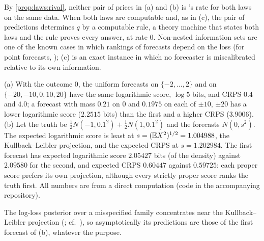 By \cref{prop:laws:rival}, neither pair of prices in (a) and (b) is \SAIabbr's rate for both laws on the same data. When both laws are computable and, as in (c), the pair of predictions determines $q$ by a computable rule, a theory machine that states both laws and the rule proves every answer, at rate $0$. Non-nested information sets are one of the known cases in which rankings of forecasts depend on the loss (for point forecasts, \citealp{patton2020comparing}); (c) is an exact instance in which no forecaster is miscalibrated relative to its own information.

\begin{example}\label{ex:laws:misspecified}
(a) With the outcome $0$, the uniform forecasts on $\{-2,\dots,2\}$ and on $\{-20,-10,0,10,20\}$ have the same logarithmic score, $\log5$ bits, and CRPS $0.4$ and $4.0$; a forecast with mass $0.21$ on $0$ and $0.1975$ on each of $\pm10$, $\pm20$ has a lower logarithmic score ($2.2515$ bits) than the first and a higher CRPS ($3.9006$). (b) Let the truth be $\frac12N(-1,0.1^2)+\frac12N(1,0.1^2)$ and the forecasts $N(0,s^2)$. The expected logarithmic score is least at $s=(\mathbb{E} X^2)^{1/2}=1.004988$, the Kullback--Leibler projection, and the expected CRPS at $s=1.202984$. The first forecast has expected logarithmic score $2.05427$ bits (of the density) against $2.09580$ for the second, and expected CRPS $0.60447$ against $0.59725$: each proper score prefers its own projection, although every strictly proper score ranks the truth first. All numbers are from a direct computation (code in the accompanying repository).
\end{example}

The log-loss posterior over a misspecified family concentrates near the Kullback--Leibler projection (\citealp{kleijn2006misspecification}; cf.\ \citealp{berk1966limiting}), so asymptotically its predictions are those of the first forecast of (b), whatever the purpose.

